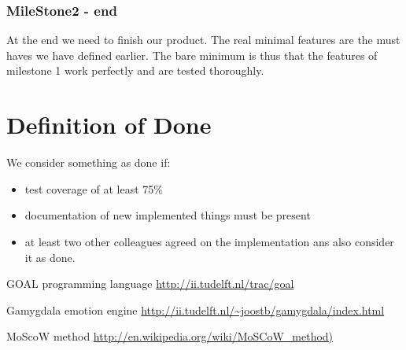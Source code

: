 \documentclass[]{article}
\begin{document}
\subsubsection{MileStone2 - end}
At the end we need to finish our product. The real minimal features are the must haves we have defined earlier. The bare minimum is thus that the features of milestone 1 work perfectly and are tested thoroughly.
\pagebreak
\section{Definition of Done}
We consider something as done if:
\begin{itemize}
	\item test coverage of at least 75\%
	\item documentation of new implemented things must be present
	\item at least two other colleagues agreed on the implementation ans also consider it as done.
\end{itemize}

\clearpage
\printglossaries


\begin{thebibliography}{9}
	
	GOAL programming language
	\url{http://ii.tudelft.nl/trac/goal}
	
	Gamygdala emotion engine
	\url{http://ii.tudelft.nl/~joostb/gamygdala/index.html}
	
	MoScoW method
	\url{http://en.wikipedia.org/wiki/MoSCoW_method) }
	
	
\end{thebibliography}
\end{document}
